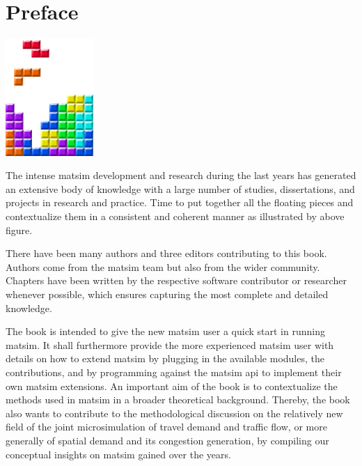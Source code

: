 \chapter*{Preface}

\begin{center} \includegraphics[width=0.25\textwidth, angle=0]{figures/MATSimBook.png} \end{center}

The intense \gls{matsim} development and research during the last years has generated an extensive body of knowledge with a large number of studies, dissertations, and projects in research and practice. Time to put together all the floating pieces and contextualize them in a consistent and coherent manner as illustrated by above figure. 

There have been many authors and three editors contributing to this book. Authors come from the \gls{matsim} team but also from the wider community. Chapters have been written by the respective software contributor or researcher whenever possible, which ensures capturing the most complete and detailed knowledge.

The book is intended to give the new \gls{matsim} user a quick start in running \gls{matsim}. It shall furthermore provide the more experienced \gls{matsim} user with details on how to extend \gls{matsim} by plugging in the available modules, \ie the \glspl{contribution}, and by programming against the \gls{matsim} \gls{api} to implement their own \gls{matsim} \glspl{extension}. An important aim of the book is to contextualize the methods used in \gls{matsim} in a broader theoretical background. Thereby, the book also wants to contribute to the methodological discussion on the relatively new field of the joint \gls{microsimulation} of travel demand and traffic flow, or more generally of spatial demand and its congestion generation, by compiling our conceptual insights on \gls{matsim} gained over the years.

